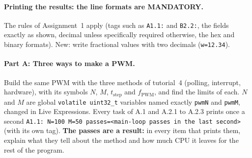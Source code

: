 \documentclass[11pt,a4paper]{article}
\begin{document}
\paragraph{Printing the results: the line formats are MANDATORY.}
The rules of Assignment~1 apply (tags such as \texttt{A1.1:} and \texttt{B2.2:}, the fields exactly as shown,
decimal unless specifically required otherwise, the hex and binary formats). New: write fractional values with two
decimals (\texttt{w=12.34}).

\paragraph{Part A: Three ways to make a PWM.}
Build the same PWM with the three methods of tutorial~4 (polling, interrupt, hardware), with its symbols $N$, $M$, $t_\mathrm{step}$ and
$f_\mathrm{PWM}$, and find the limits of each. $N$ and $M$ are global \texttt{volatile uint32\_t} variables named
exactly \texttt{pwmN} and \texttt{pwmM}, changed in Live Expressions. Every task of A.1 and A.2.1 to A.2.3 prints
once a second \texttt{A1.1: N=100 M=50 passes=<main-loop passes in the last second>} (with its own tag).
\textbf{The passes are a result:} in every item that prints them, explain what they tell about the method and how
much CPU it leaves for the rest of the program.
\end{document}

